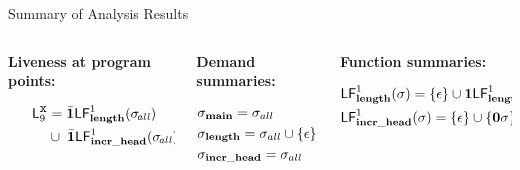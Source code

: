 \documentclass[xcolor=x11names,compress,mathserif]{beamer}
\renewcommand{\(}{\begin{columns}}
\renewcommand{\)}{\end{columns}}
\newcommand{\<}[1]{\begin{column}{#1}}
\renewcommand{\>}{\end{column}}
\begin{document}
\begin{frame}[t]{Summary of Analysis Results}
  \scriptsize
  \begin{columns}[c]
    \begin{column}[T]{0.33\textwidth}
      \vspace*{1.5cm}
      \centerline{\bf Liveness at program points:}
      \begin{align*}
        \mathsf{L}_{{9}}^{\mbox{\tt x}}  &=  \bar{\mathbf{1}}\mathsf{LF}_{\mathit {\mathbf{length}}}^{1}( {\mathit \sigma_{\mathit{\!all}}}) \\
        \;\;\;\;\;\;\;\;\;\;  &\cup\; \bar{\mathbf{1}}\mathsf{LF}_{\mathit {\mathbf{incr\_head}}}^{1}( {\mathit \sigma_{\mathit{\!all}}})\\ 
      \end{align*}
    \end{column}
    \begin{column}[T]{0.33\textwidth}
      \vspace*{1.5cm}
      \centerline{\bf Demand summaries:}
      \begin{align*}
        &\sigma_{\mathbf{main}} = \sigma_{all}\\
        &\sigma_{\mathbf{length}} = \sigma_{all} \cup \{\epsilon\}\\
        &\sigma_{\mathbf{incr\_head}} = \sigma_{all}\\
      \end{align*}
    \end{column}
    
    \begin{column}[T]{0.33\textwidth}
      \vspace*{1.5cm}
      \centerline{\bf Function summaries:}
      \begin{align*}
        &\mathsf{LF}_{\mathit {\mathbf{length}}}^{1}( {\mathit \sigma}) = \{\epsilon\} \cup \mathbf{1}\mathsf{LF}_{\mathit {\mathbf{length}}}^{1}( {\mathit \epsilon})\\
        &\mathsf{LF}_{\mathit {\mathbf{incr\_head}}}^{1}( {\mathit \sigma}) = \{\epsilon\} \cup \{\mathbf{0}\sigma\}\\
      \end{align*}
    \end{column}
  \end{columns}
\end{frame}
\end{document}
